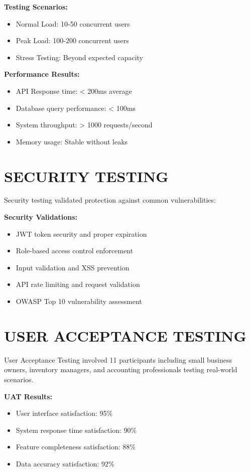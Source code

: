 \textbf{Testing Scenarios:}
\begin{itemize}
\item Normal Load: 10-50 concurrent users
\item Peak Load: 100-200 concurrent users  
\item Stress Testing: Beyond expected capacity
\end{itemize}

\textbf{Performance Results:}
\begin{itemize}
\item API Response time: < 200ms average
\item Database query performance: < 100ms
\item System throughput: > 1000 requests/second
\item Memory usage: Stable without leaks
\end{itemize}

\section{SECURITY TESTING}

Security testing validated protection against common vulnerabilities:

\textbf{Security Validations:}
\begin{itemize}
\item JWT token security and proper expiration
\item Role-based access control enforcement
\item Input validation and XSS prevention
\item API rate limiting and request validation
\item OWASP Top 10 vulnerability assessment
\end{itemize}

\section{USER ACCEPTANCE TESTING}

User Acceptance Testing involved 11 participants including small business owners, inventory managers, and accounting professionals testing real-world scenarios.

\textbf{UAT Results:}
\begin{itemize}
\item User interface satisfaction: 95\%
\item System response time satisfaction: 90\%
\item Feature completeness satisfaction: 88\%
\item Data accuracy satisfaction: 92\%
\end{itemize}

